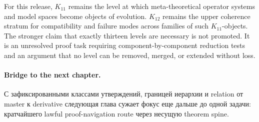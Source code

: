 For this release, \(K_{11}\) remains the level at which meta-theoretical
operator systems and model spaces become objects of evolution. \(K_{12}\)
remains the upper coherence stratum for compatibility and failure modes across
families of such \(K_{11}\)-objects. The stronger claim that exactly thirteen
levels are necessary is not promoted. It is an unresolved proof task requiring
component-by-component reduction tests and an argument that no level can be
removed, merged, or extended without loss.

\paragraph{Bridge to the next chapter.}
С зафиксированными классами утверждений, границей иерархии и relation от
master к derivative следующая глава сужает фокус еще дальше до одной задачи:
кратчайшего lawful proof-navigation route через несущую theorem spine.

\clearpage
